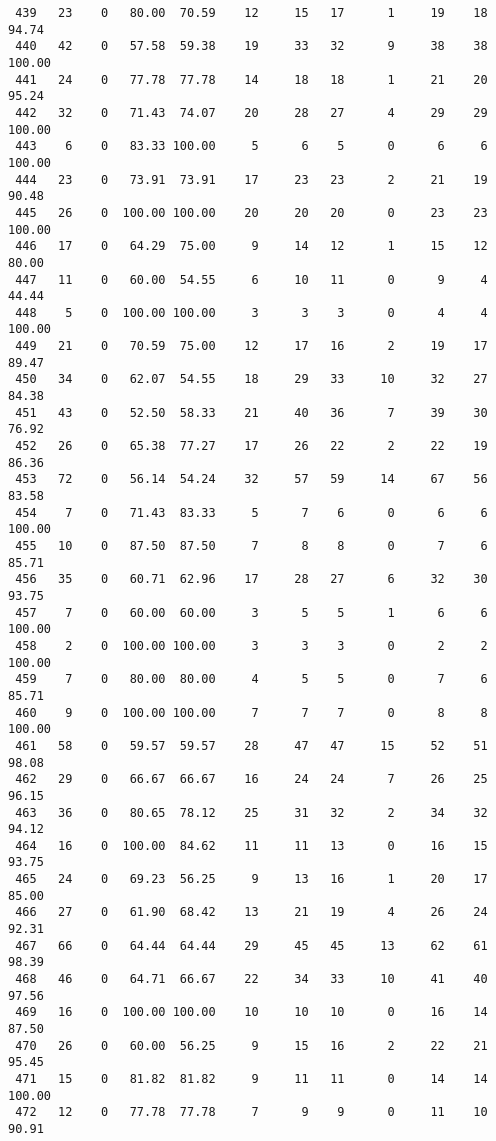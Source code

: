 \begin{verbatim}
 439   23    0   80.00  70.59    12     15   17      1     19    18    94.74
 440   42    0   57.58  59.38    19     33   32      9     38    38   100.00
 441   24    0   77.78  77.78    14     18   18      1     21    20    95.24
 442   32    0   71.43  74.07    20     28   27      4     29    29   100.00
 443    6    0   83.33 100.00     5      6    5      0      6     6   100.00
 444   23    0   73.91  73.91    17     23   23      2     21    19    90.48
 445   26    0  100.00 100.00    20     20   20      0     23    23   100.00
 446   17    0   64.29  75.00     9     14   12      1     15    12    80.00
 447   11    0   60.00  54.55     6     10   11      0      9     4    44.44
 448    5    0  100.00 100.00     3      3    3      0      4     4   100.00
 449   21    0   70.59  75.00    12     17   16      2     19    17    89.47
 450   34    0   62.07  54.55    18     29   33     10     32    27    84.38
 451   43    0   52.50  58.33    21     40   36      7     39    30    76.92
 452   26    0   65.38  77.27    17     26   22      2     22    19    86.36
 453   72    0   56.14  54.24    32     57   59     14     67    56    83.58
 454    7    0   71.43  83.33     5      7    6      0      6     6   100.00
 455   10    0   87.50  87.50     7      8    8      0      7     6    85.71
 456   35    0   60.71  62.96    17     28   27      6     32    30    93.75
 457    7    0   60.00  60.00     3      5    5      1      6     6   100.00
 458    2    0  100.00 100.00     3      3    3      0      2     2   100.00
 459    7    0   80.00  80.00     4      5    5      0      7     6    85.71
 460    9    0  100.00 100.00     7      7    7      0      8     8   100.00
 461   58    0   59.57  59.57    28     47   47     15     52    51    98.08
 462   29    0   66.67  66.67    16     24   24      7     26    25    96.15
 463   36    0   80.65  78.12    25     31   32      2     34    32    94.12
 464   16    0  100.00  84.62    11     11   13      0     16    15    93.75
 465   24    0   69.23  56.25     9     13   16      1     20    17    85.00
 466   27    0   61.90  68.42    13     21   19      4     26    24    92.31
 467   66    0   64.44  64.44    29     45   45     13     62    61    98.39
 468   46    0   64.71  66.67    22     34   33     10     41    40    97.56
 469   16    0  100.00 100.00    10     10   10      0     16    14    87.50
 470   26    0   60.00  56.25     9     15   16      2     22    21    95.45
 471   15    0   81.82  81.82     9     11   11      0     14    14   100.00
 472   12    0   77.78  77.78     7      9    9      0     11    10    90.91

\end{verbatim}
